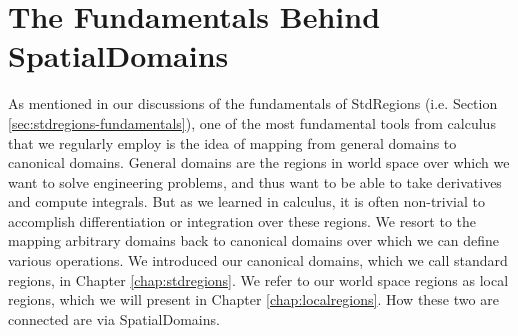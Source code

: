 %
\section{The Fundamentals Behind SpatialDomains}
\label{sec:spatialdomains-fundamentals}

As mentioned in our discussions of the fundamentals of StdRegions
(i.e. Section \ref{sec:stdregions-fundamentals}), one of the most
fundamental tools from calculus that we regularly employ is the idea
of mapping from general domains to canonical domains.  General domains
are the regions in world space over which we want to solve engineering
problems, and thus want to be able to take derivatives and compute
integrals.  But as we learned in calculus, it is often non-trivial to
accomplish differentiation or integration over these regions.  We
resort to the mapping arbitrary domains back to canonical domains over
which we can define various operations.  We introduced our canonical
domains, which we call standard regions, in Chapter
\ref{chap:stdregions}.  We refer to our world space regions as local
regions, which we will present in Chapter \ref{chap:localregions}.
How these two are connected are via SpatialDomains.

